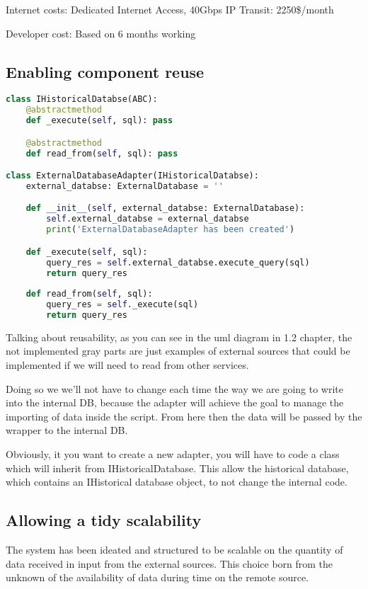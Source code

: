 Internet costs:  Dedicated Internet Access, 40Gbps IP Transit: 2250\$/month

Developer cost:  Based on 6 months working\\

\subsection{Enabling component reuse}

\begin{lstlisting}[language=Python]
class IHistoricalDatabse(ABC):
    @abstractmethod
    def _execute(self, sql): pass

    @abstractmethod
    def read_from(self, sql): pass

class ExternalDatabaseAdapter(IHistoricalDatabse):
    external_databse: ExternalDatabase = ''

    def __init__(self, external_databse: ExternalDatabase):
        self.external_databse = external_databse
        print('ExternalDatabaseAdapter has been created')

    def _execute(self, sql):
        query_res = self.external_databse.execute_query(sql)
        return query_res
    
    def read_from(self, sql):
        query_res = self._execute(sql) 
        return query_res   
\end{lstlisting}

Talking about reusability, as you can see in the uml diagram in 1.2 chapter, the not implemented gray parts are just examples of external sources that could be implemented if we will need to read from other services. 

Doing so we we'll not have to change each time the way we are going to write into the internal DB, because the adapter will achieve the goal to manage the importing of data inside the script. From here then the data will be passed by the wrapper to the internal DB.

Obviously, it you want to create a new adapter, you will have to code a class which will inherit from IHistoricalDatabase. This allow the historical database, which contains an IHistorical database object, to not change the internal code.

\subsection{Allowing a tidy scalability}

The system has been ideated and structured to be scalable on the quantity of data received in input from the external sources.
This choice born from the unknown of the availability of data during time on the remote source.

